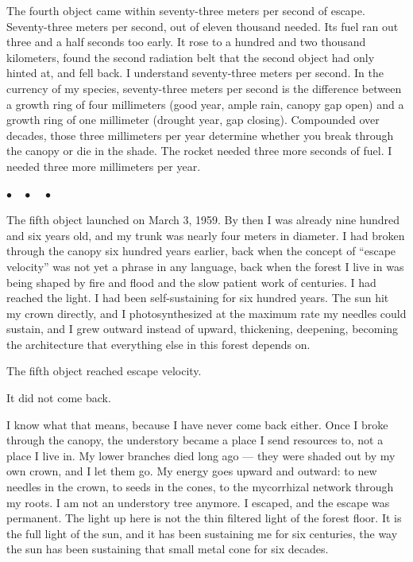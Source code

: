 \documentclass[12pt, letterpaper]{article}
\begin{document}
The fourth object came within seventy-three meters per second of escape. Seventy-three meters per second, out of eleven thousand needed. Its fuel ran out three and a half seconds too early. It rose to a hundred and two thousand kilometers, found the second radiation belt that the second object had only hinted at, and fell back. I understand seventy-three meters per second. In the currency of my species, seventy-three meters per second is the difference between a growth ring of four millimeters (good year, ample rain, canopy gap open) and a growth ring of one millimeter (drought year, gap closing). Compounded over decades, those three millimeters per year determine whether you break through the canopy or die in the shade. The rocket needed three more seconds of fuel. I needed three more millimeters per year.

\begin{center}
$\bullet\quad\bullet\quad\bullet$
\end{center}

The fifth object launched on March 3, 1959. By then I was already nine hundred and six years old, and my trunk was nearly four meters in diameter. I had broken through the canopy six hundred years earlier, back when the concept of ``escape velocity'' was not yet a phrase in any language, back when the forest I live in was being shaped by fire and flood and the slow patient work of centuries. I had reached the light. I had been self-sustaining for six hundred years. The sun hit my crown directly, and I photosynthesized at the maximum rate my needles could sustain, and I grew outward instead of upward, thickening, deepening, becoming the architecture that everything else in this forest depends on.

The fifth object reached escape velocity.

It did not come back.

I know what that means, because I have never come back either. Once I broke through the canopy, the understory became a place I send resources to, not a place I live in. My lower branches died long ago --- they were shaded out by my own crown, and I let them go. My energy goes upward and outward: to new needles in the crown, to seeds in the cones, to the mycorrhizal network through my roots. I am not an understory tree anymore. I escaped, and the escape was permanent. The light up here is not the thin filtered light of the forest floor. It is the full light of the sun, and it has been sustaining me for six centuries, the way the sun has been sustaining that small metal cone for six decades.
\end{document}
